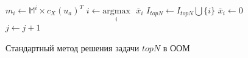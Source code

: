 \begin{figure}[htb]
\caption{Стандартный метод решения задачи $topN$ в ООМ}
\label{alg:topn-solve-ors}
\begin{algorithmic}[1]
 
	\State $m_i \gets \mathbb{M}^i \times c_X(u_a)^T$
\EndFor
{}
	\State $i \gets \underset{i}{\mathrm{argmax}} \text{ } \overline{x}_i$
	\State $I_{topN} \gets I_{topN} \bigcup \{i\}$
\bigbreak
  \State $\overline{x}_i \gets 0$ 
  \State $j \gets j + 1$
\EndFor
\end{algorithmic}
\end{figure}
